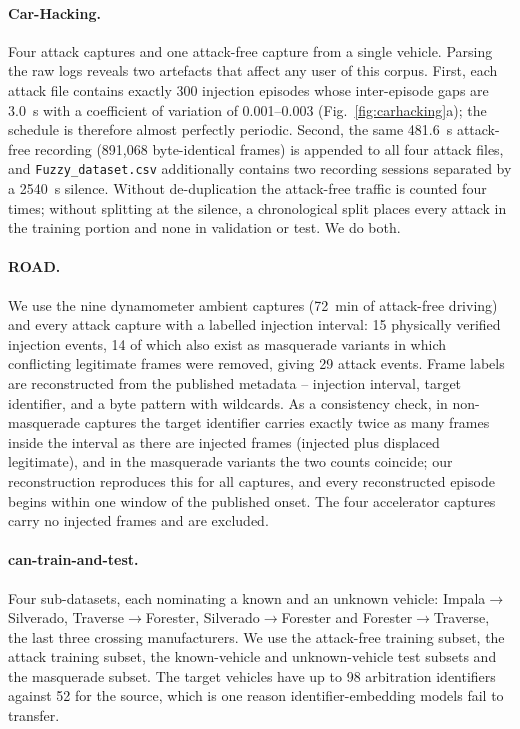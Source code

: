 \documentclass[preprint,11pt,authoryear]{elsarticle}
\begin{document}
\paragraph{Car-Hacking.} Four attack captures and one attack-free capture from a single vehicle.
Parsing the raw logs reveals two artefacts that affect any user of this corpus. First, each attack
file contains exactly 300 injection episodes whose inter-episode gaps are \SI{3.0}{\second} with a
coefficient of variation of 0.001--0.003 (Fig.~\ref{fig:carhacking}a); the schedule is therefore
almost perfectly periodic. Second, the same \SI{481.6}{\second} attack-free recording
(891{,}068 byte-identical frames) is appended to all four attack files, and
\texttt{Fuzzy\_dataset.csv} additionally contains two recording sessions separated by a
\SI{2540}{\second} silence. Without de-duplication the attack-free traffic is counted four times;
without splitting at the silence, a chronological split places every attack in the training portion
and none in validation or test. We do both.

\paragraph{ROAD.} We use the nine dynamometer ambient captures (\SI{72}{\minute} of attack-free
driving) and every attack capture with a labelled injection interval: 15 physically verified
injection events, 14 of which also exist as masquerade variants in which conflicting legitimate
frames were removed, giving 29 attack events. Frame labels are reconstructed from the published
metadata -- injection interval, target identifier, and a byte pattern with wildcards. As a
consistency check, in non-masquerade captures the target identifier carries exactly twice as many
frames inside the interval as there are injected frames (injected plus displaced legitimate), and in
the masquerade variants the two counts coincide; our reconstruction reproduces this for all
captures, and every reconstructed episode begins within one window of the published onset. The four
accelerator captures carry no injected frames and are excluded.

\paragraph{can-train-and-test.} Four sub-datasets, each nominating a known and an unknown vehicle:
Impala$\rightarrow$Silverado, Traverse$\rightarrow$Forester, Silverado$\rightarrow$Forester and
Forester$\rightarrow$Traverse, the last three crossing manufacturers. We use the attack-free training
subset, the attack training subset, the known-vehicle and unknown-vehicle test subsets and the
masquerade subset. The target vehicles have up to 98 arbitration identifiers against 52 for the
source, which is one reason identifier-embedding models fail to transfer.
\end{document}
